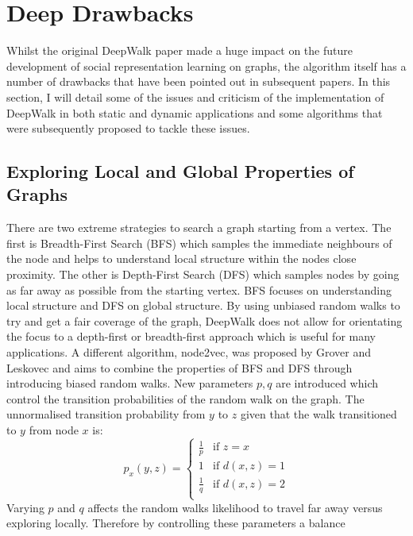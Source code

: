 \documentclass[a4paper]{article}
\begin{document}
\section{Deep Drawbacks}
Whilst the original DeepWalk paper made a huge impact on the future development
of social representation learning on graphs, the algorithm itself has a number
of drawbacks that have been pointed out in subsequent papers. In this section, I will detail some of the issues and criticism of the implementation of
DeepWalk in both static and dynamic applications and some algorithms that were subsequently proposed to tackle these issues.\\

\subsection{Exploring Local and Global Properties of Graphs}
There are two extreme strategies to search a graph starting from a vertex. The
first is Breadth-First Search (BFS) which samples the immediate neighbours of
the node and helps to understand local structure within the nodes close
proximity. The other is Depth-First Search (DFS) which samples nodes by going as
far away as possible from the starting vertex. BFS focuses on understanding
local structure and DFS on global structure. By using unbiased random walks to
try and get a fair coverage of the graph, DeepWalk does not allow for
orientating the focus to a depth-first or breadth-first approach which is useful
for many applications. A different algorithm, node2vec, was proposed by Grover
and Leskovec\cite{grover_leskovec2016} and aims to combine the
properties of BFS and DFS through introducing biased random walks. New
parameters $p,q$ are introduced which control the transition probabilities of
the random walk on the graph. The unnormalised transition probability from $y$
to $z$ given that the walk transitioned to $y$ from node $x$ is:
\begin{equation}
  p_x(y,z)= 
  \begin{cases}
    \frac{1}{p}& \text{if } z = x\\
    1          & \text{if } d(x,z) = 1\\
    \frac{1}{q}& \text{if } d(x,z) = 2\\
  \end{cases}
\end{equation}
Varying $p$ and $q$ affects the random walks likelihood to travel far away
versus exploring locally. Therefore by controlling these parameters a balance
\end{document}
